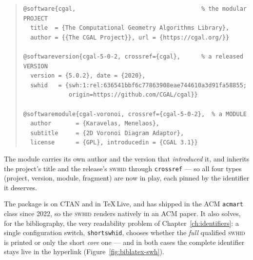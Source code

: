 \begin{quote}\footnotesize
\begin{verbatim}
@software{cgal,                                    % the modular PROJECT
  title  = {The Computational Geometry Algorithms Library},
  author = {{The CGAL Project}}, url = {https://cgal.org/}}

@softwareversion{cgal-5-0-2, crossref={cgal},      % a released VERSION
  version = {5.0.2}, date = {2020},
  swhid   = {swh:1:rel:636541bbf6c77863908eae744610a3d91fa58855;
             origin=https://github.com/CGAL/cgal}}

@softwaremodule{cgal-voronoi, crossref={cgal-5-0-2},  % a MODULE
  author       = {Karavelas, Menelaos},
  subtitle     = {2D Voronoi Diagram Adaptor},
  license      = {GPL}, introducedin = {CGAL 3.1}}
\end{verbatim}
\end{quote}

\noindent The module carries its own author and the version that \emph{introduced} it, and inherits
the project's title and the release's \textsc{swhid} through \texttt{crossref} --- so all four types
(project, version, module, fragment) are now in play, each pinned by the identifier it deserves.

\noindent The package is on CTAN and in TeX\,Live, and has shipped in the ACM \texttt{acmart} class
since 2022, so the \textsc{swhid} renders natively in an ACM paper. It also solves, for the
bibliography, the very readability problem of Chapter~\ref{ch:identifiers}: a single configuration
switch, \texttt{shortswhid}, chooses whether the \emph{full} qualified \textsc{swhid} is printed or
only the short \emph{core} one --- and in both cases the complete identifier stays live in the
hyperlink (Figure~\ref{fig:biblatex-swh}).

